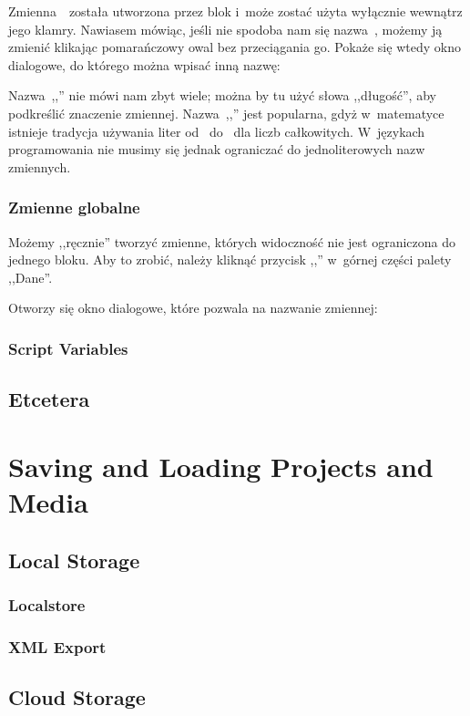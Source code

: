 \documentclass{report}
\begin{document}
Zmienna~~została utworzona przez blok  i~może zostać użyta wyłącznie wewnątrz jego klamry. Nawiasem mówiąc, jeśli nie spodoba nam się nazwa~, możemy ją zmienić klikając pomarańczowy owal bez przeciągania go. Pokaże się wtedy okno dialogowe, do którego można wpisać inną nazwę:


Nazwa~,,'' nie mówi nam zbyt wiele; można by tu użyć słowa ,,długość'', aby podkreślić znaczenie zmiennej. Nazwa~,,'' jest popularna, gdyż w~matematyce istnieje tradycja używania liter od~ do~ dla liczb całkowitych. W~językach programowania nie musimy się jednak ograniczać do jednoliterowych nazw zmiennych.

\subsection{Zmienne globalne}

Możemy ,,ręcznie'' tworzyć zmienne, których widoczność nie jest ograniczona do jednego bloku. Aby to zrobić, należy kliknąć przycisk ,,'' w~górnej części palety ,,Dane''.


Otworzy się okno dialogowe, które pozwala na nazwanie zmiennej:

\subsection{Script Variables}
\section{Etcetera}
\chapter{Saving and Loading Projects and Media}
\section{Local Storage}
\subsection{Localstore}
\subsection{XML Export}
\section{Cloud Storage}
\end{document}
